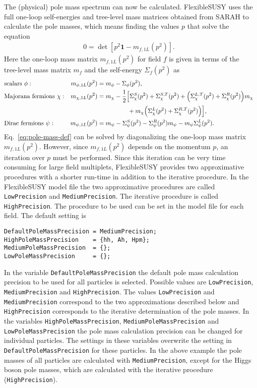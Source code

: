 \documentclass[final,3p,11pt,pdflatex]{elsarticle}
\makeatletter
\newcommand{\fs}{FlexibleSUSY\@\xspace}
\newcommand{\code}[1]{\lstinline|#1|}  %
\newcommand{\unity}{\mathbf{1}}
\makeatother
\begin{document}
The (physical) pole mass spectrum can now be calculated.  \fs uses the
full one-loop self-energies and tree-level mass matrices obtained from
SARAH to calculate the pole masses, which means finding the values $p$
that solve the equation
%
\begin{align}
  0 = \det\left[p^2\unity - m_{f,1L}(p^2)\right].
  \label{eq:pole-mass-def}
\end{align}
%
Here the one-loop mass matrix $m_{f,1L}(p^2)$ for field $f$ is given
in terms of the tree-level mass matrix $m_f$ and the self-energy
$\Sigma_f(p^2)$ as
%
\begin{align}
  &\text{scalars } \phi: &
  m_{\phi,1L}(p^2) &= m_{\phi} - \Sigma_\phi(p^2), \\
  &\text{Majorana fermions } \chi: &
  m_{\chi,1L}(p^2) &= m_{\chi} - \frac{1}{2}\Big[
    \Sigma_\chi^S(p^2) + \Sigma_\chi^{S,T}(p^2)
    + \Big( \Sigma_\chi^{L,T}(p^2) + \Sigma_\chi^R(p^2) \Big) m_{\chi} \notag \\
    &&&\phantom{= m_{\chi} - \frac{1}{2}\Big[}
    + m_{\chi} \Big( \Sigma_\chi^L(p^2) + \Sigma_\chi^{R,T}(p^2) \Big)
  \Big], \\
  &\text{Dirac fermions } \psi: &
  m_{\psi,1L}(p^2) &= m_{\psi}
  - \Sigma_\psi^S(p^2)
  - \Sigma_\psi^R(p^2) m_{\psi}
  - m_{\psi} \Sigma_\psi^L(p^2) .
\end{align}
%
Eq.~\eqref{eq:pole-mass-def} can be solved by diagonalizing the
one-loop mass matrix $m_{f,1L}(p^2)$.  However, since $m_{f,1L}(p^2)$
depends on the momentum $p$, an iteration over $p$ must be performed.
Since this iteration can be very time consuming for large field
multiplets, \fs provides two approximative procedures with a shorter
run-time in addition to the iterative procedure.  In the \fs model
file the two approximative procedures are called \code{LowPrecision}
and \code{MediumPrecision}.  The iterative procedure is called
\code{HighPrecision}.  The procedure to be used can be set in the
model file for each field.  The default setting is
%
\begin{lstlisting}
DefaultPoleMassPrecision = MediumPrecision;
HighPoleMassPrecision    = {hh, Ah, Hpm};
MediumPoleMassPrecision  = {};
LowPoleMassPrecision     = {};
\end{lstlisting}
%
In the variable \code{DefaultPoleMassPrecision} the default pole mass
calculation precision to be used for all particles is selected.
Possible values are \code{LowPrecision}, \code{MediumPrecision} and
\code{HighPrecision}.  The values \code{LowPrecision} and
\code{MediumPrecision} correspond to the two approximations described
below and \code{HighPrecision} corresponds to the iterative
determination of the pole masses.  In the variables
\code{HighPoleMassPrecision}, \code{MediumPoleMassPrecision} and
\code{LowPoleMassPrecision} the pole mass calculation precision can be
changed for individual particles.  The settings in these variables
overwrite the setting in \code{DefaultPoleMassPrecision} for these
particles.  In the above example the pole masses of all particles are
calculated with \code{MediumPrecision}, except for the Higgs boson
pole masses, which are calculated with the iterative procedure
(\code{HighPrecision}).
\end{document}
